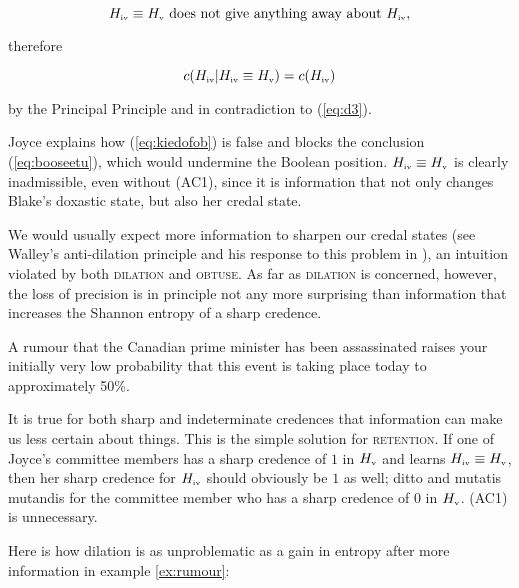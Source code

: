 \documentclass[11pt]{article}
\begin{document}
\begin{equation}
  \label{eq:kiedofob}
H_{\mbox{\tiny{iv}}}\equiv{}H_{\mbox{\tiny{v}}}\mbox{ does not give anything away about }H_{\mbox{\tiny{iv}}}, 
\end{equation}

{\noindent}therefore

\begin{equation}
  \label{eq:booseetu}
c(H_{\mbox{\tiny{iv}}}|H_{\mbox{\tiny{iv}}}\equiv{}H_{\mbox{\tiny{v}}})=c(H_{\mbox{\tiny{iv}}})  
\end{equation}

{\noindent}by the Principal Principle and in contradiction to (\ref{eq:d3}).

Joyce explains how (\ref{eq:kiedofob}) is false and blocks the
conclusion (\ref{eq:booseetu}), which would undermine the Boolean
position. $H_{\mbox{\tiny{iv}}}\equiv{}H_{\mbox{\tiny{v}}}$ is clearly
inadmissible, even without (AC1), since it is information that not
only changes Blake's doxastic state, but also her credal
state.

We would usually expect more information to sharpen our credal states
(see Walley's anti-dilation principle and his response to this problem
in ), an intuition violated by both
\textsc{dilation} and \textsc{obtuse}. As far as \textsc{dilation} is
concerned, however, the loss of precision is in principle not any more
surprising than information that increases the Shannon entropy of a
sharp credence.

\begin{quotex}
  \label{ex:rumour} A rumour that the Canadian prime
  minister has been assassinated raises your initially very low
  probability that this event is taking place today to approximately
  50\%.
\end{quotex}

It is true for both sharp and indeterminate credences that information
can make us less certain about things. This is the simple solution for
\textsc{retention}. If one of Joyce's committee members has a sharp
credence of $1$ in $H_{\mbox{\tiny{v}}}$ and learns
$H_{\mbox{\tiny{iv}}}\equiv{}H_{\mbox{\tiny{v}}}$, then her sharp
credence for $H_{\mbox{\tiny{iv}}}$ should obviously be $1$ as well;
ditto and mutatis mutandis for the committee member who has a sharp
credence of $0$ in $H_{\mbox{\tiny{v}}}$. (AC1) is unnecessary.

Here is how dilation is as unproblematic as a gain in entropy after
more information in example \ref{ex:rumour}:
\end{document}
